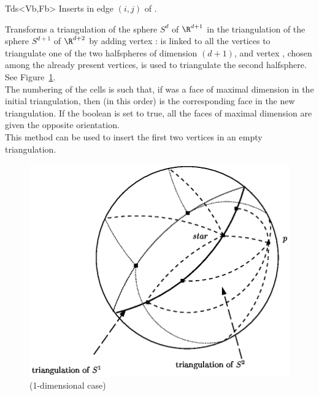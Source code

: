 \begin{ccClassTemplate}{Tds<Vb,Fb>}
{Inserts  in edge $(i,j)$ of .
}

{Transforms a triangulation of the sphere $S^d$ of $\R^{d+1}$ in the
triangulation of the sphere $S^{d+1}$ of $\R^{d+2}$ by adding vertex :  
 is linked to all the vertices to triangulate one of the two
halfspheres of dimension $(d+1)$, and vertex , chosen among
the already present vertices, is used to triangulate the second
halfsphere. See Figure~\ref{TDS3-fig-topo-insert_outside_affine_hull}.\\ 
The numbering of the cells is such that, if  was a face of
maximal dimension in the initial triangulation, then  (in
this order) is the corresponding face in the new triangulation. If the
boolean  is set to true, all the faces of maximal
dimension are given the opposite orientation.\\
This method can be used to insert the first two vertices in an empty
triangulation.
} 

\begin{ccTexOnly}
\begin{figure}[htbp]

\begin{center} 
\includegraphics{topo-insert_outside_affine_hull.eps} 
\end{center}
\caption{\protect{} (1-dimensional case) \label{TDS3-fig-topo-insert_outside_affine_hull}}
\end{figure} 
\end{ccTexOnly}


\end{ccClassTemplate}
